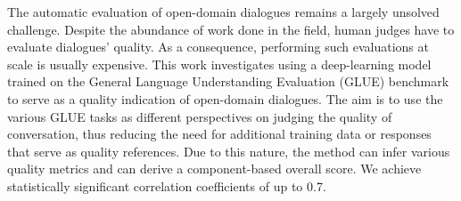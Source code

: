 The automatic evaluation of open-domain dialogues remains a largely unsolved challenge. Despite the abundance of work done in the field, human judges have to evaluate dialogues' quality. As a consequence, performing such evaluations at scale is usually expensive. This work investigates using a deep-learning model trained on the General Language Understanding Evaluation (GLUE) benchmark to serve as a quality indication of open-domain dialogues. The aim is to use the various GLUE tasks as different perspectives on judging the quality of conversation, thus reducing the need for additional training data or responses that serve as quality references. Due to this nature, the method can infer various quality metrics and can derive a component-based overall score. We achieve statistically significant correlation coefficients of up to 0.7.

